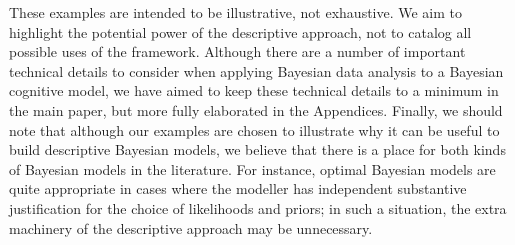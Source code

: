 These examples are intended to be illustrative, not exhaustive. We aim to highlight the potential power of the descriptive approach, not to catalog all possible uses of the framework. Although there are a number of important technical details to consider when applying Bayesian data analysis to a Bayesian cognitive model, we have aimed to keep these technical details to a minimum in the main paper, but more fully elaborated in the Appendices. Finally, we should note that although our examples are chosen to illustrate why it can be useful to build descriptive Bayesian models, we believe that there is a place for both kinds of Bayesian models in the literature. For instance, optimal Bayesian models are quite appropriate in cases where the modeller has independent substantive justification for the choice of likelihoods and priors; in such a situation, the extra machinery of the descriptive approach may be unnecessary.



